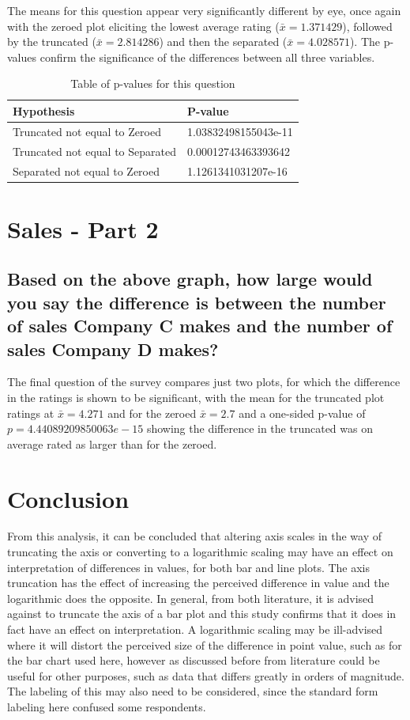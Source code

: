 \documentclass[
  11pt,
]{book}
\begin{document}
The means for this question appear very significantly different by eye,
once again with the zeroed plot eliciting the lowest average rating
(\(\bar{x} = 1.371429\)), followed by the truncated
(\(\bar{x} = 2.814286\)) and then the separated
(\(\bar{x} = 4.028571\)). The p-values confirm the significance of the
differences between all three variables.

\begin{table}[!h]

\caption{\label{tab:unnamed-chunk-73}Table of p-values for this question}
\centering
\begin{tabular}[t]{l|l}
\hline
Hypothesis & P-value\\
\hline
Truncated not equal to Zeroed & 1.03832498155043e-11\\
\hline
Truncated not equal to Separated & 0.00012743463393642\\
\hline
Separated not equal to Zeroed & 1.1261341031207e-16\\
\hline
\end{tabular}
\end{table}

\section{Sales - Part 2}

\subsection{Based on the above graph, how large would you say the difference is between the number of sales Company C makes and the number of sales Company D makes?}

The final question of the survey compares just two plots, for which the
difference in the ratings is shown to be significant, with the mean for
the truncated plot ratings at \(\bar{x} = 4.271\) and for the zeroed
\(\bar{x} = 2.7\) and a one-sided p-value of \(p=4.44089209850063e-15\)
showing the difference in the truncated was on average rated as larger
than for the zeroed.

\section{Conclusion}

From this analysis, it can be concluded that altering axis scales in the
way of truncating the axis or converting to a logarithmic scaling may
have an effect on interpretation of differences in values, for both bar
and line plots. The axis truncation has the effect of increasing the
perceived difference in value and the logarithmic does the opposite. In
general, from both literature, it is advised against to truncate the
axis of a bar plot and this study confirms that it does in fact have an
effect on interpretation. A logarithmic scaling may be ill-advised where
it will distort the perceived size of the difference in point value,
such as for the bar chart used here, however as discussed before from
literature could be useful for other purposes, such as data that differs
greatly in orders of magnitude. The labeling of this may also need to be
considered, since the standard form labeling here confused some
respondents.
\end{document}

